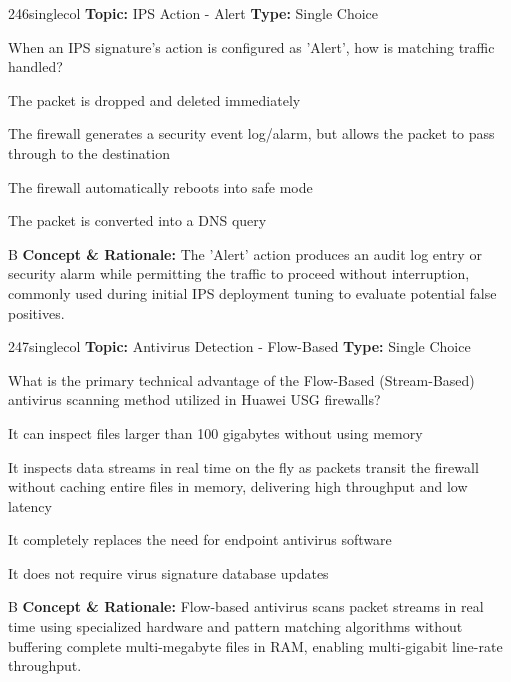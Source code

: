 \begin{qcard}{246}{singlecol}
\textcolor{darkslate!75}{\small\textbf{Topic:} IPS Action - Alert \hfill \textbf{Type:} Single Choice}\vspace{0.4em}\par
When an IPS signature's action is configured as 'Alert', how is matching traffic handled?
\begin{qoptions}
\item The packet is dropped and deleted immediately
\item The firewall generates a security event log/alarm, but allows the packet to pass through to the destination
\item The firewall automatically reboots into safe mode
\item The packet is converted into a DNS query
\end{qoptions}
\end{qcard}
\nopagebreak
\begin{explainbox}{B}
\textbf{Concept \& Rationale:} The 'Alert' action produces an audit log entry or security alarm while permitting the traffic to proceed without interruption, commonly used during initial IPS deployment tuning to evaluate potential false positives.
\end{explainbox}

\begin{qcard}{247}{singlecol}
\textcolor{darkslate!75}{\small\textbf{Topic:} Antivirus Detection - Flow-Based \hfill \textbf{Type:} Single Choice}\vspace{0.4em}\par
What is the primary technical advantage of the Flow-Based (Stream-Based) antivirus scanning method utilized in Huawei USG firewalls?
\begin{qoptions}
\item It can inspect files larger than 100 gigabytes without using memory
\item It inspects data streams in real time on the fly as packets transit the firewall without caching entire files in memory, delivering high throughput and low latency
\item It completely replaces the need for endpoint antivirus software
\item It does not require virus signature database updates
\end{qoptions}
\end{qcard}
\nopagebreak
\begin{explainbox}{B}
\textbf{Concept \& Rationale:} Flow-based antivirus scans packet streams in real time using specialized hardware and pattern matching algorithms without buffering complete multi-megabyte files in RAM, enabling multi-gigabit line-rate throughput.
\end{explainbox}


